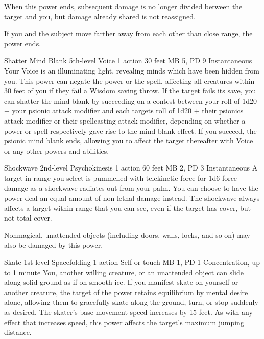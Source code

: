   When this power ends,
  subsequent damage is no longer divided between the target and you,
  but damage already shared is not reassigned.

  If you and the subject move farther away from each other
  than close range, the power ends.

\DndPowerHeader%
  {Shatter Mind Blank}
  {5th-level Voice}
  {1 action}
  {30 feet}
  {MB 5, PD 9}
  {Instantaneous}
  Your Voice is an illuminating light,
  revealing minds which have been hidden from you.
  This power can negate the  power
  or the  spell,
  affecting all creatures within 30 feet of you
  if they fail a Wisdom saving throw.
  If the target fails its save,
  you can shatter the mind blank by succeeding on a
  contest between your roll of
  1d20 + your psionic attack modifier
  and each targets roll of 
  1d20 + their psionics attack modifier or
  their spellcasting attack modifier,
  depending on whether a power or spell respectively
  gave rise to the mind blank effect.
  If you succeed,
  the psionic mind blank ends,
  allowing you to affect the target thereafter
  with Voice or any other powers and abilities.

\DndPowerHeader%
  {Shockwave}
  {2nd-level Psychokinesis}
  {1 action}
  {60 feet}
  {MB 2, PD 3}
  {Instantaneous}
A target in range you select is pummelled with telekinetic force
for 1d6 force damage as a shockwave radiates out from your palm.
You can choose to have the power deal an equal amount of
non-lethal damage instead.
The shockwave always affects a target within range that you can see,
even if the target has cover, but not total cover.

Nonmagical, unattended objects
(including doors, walls, locks, and so on)
may also be damaged by this power.

\DndPowerHeader%
  {Skate}
  {1st-level Spacefolding}
  {1 action}
  {Self or touch}
  {MB 1, PD 1}
  {Concentration, up to 1 minute}
  You, another willing creature, or an unattended object
  can slide along solid ground as if on smooth ice.
  If you manifest skate on yourself or another creature,
  the target of the power retains equilibrium by mental desire alone,
  allowing them to gracefully skate along the ground,
  turn, or stop suddenly as desired.
  The skater's base movement speed increases by 15 feet.
  As with any effect that increases speed,
  this power affects the target's maximum jumping distance.

